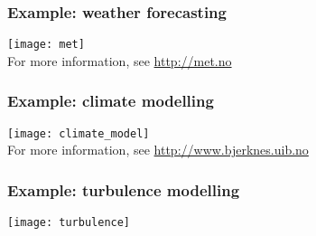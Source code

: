 \begin{frame}
  \frametitle{Example: weather forecasting}
  \begin{center}
    \texttt{[image: met]} \\
    For more information, see \url{http://met.no}
  \end{center}
\end{frame}

\begin{frame}
  \frametitle{Example: climate modelling}
  \begin{center}
    \texttt{[image: climate\_model]} \\
    For more information, see \url{http://www.bjerknes.uib.no}
  \end{center}
\end{frame}

\begin{frame}
  \frametitle{Example: turbulence modelling}
  \begin{center}
    \texttt{[image: turbulence]}
  \end{center}
\end{frame}


